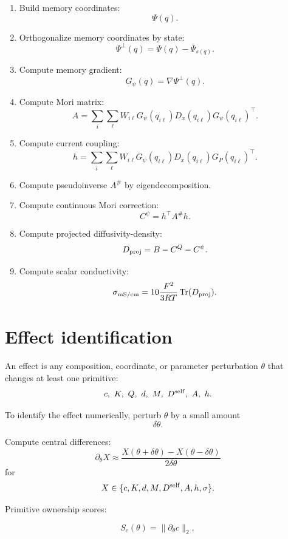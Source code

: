 \documentclass[11pt]{article}
\newcommand{\Tr}{\operatorname{Tr}}
\begin{document}
\begin{enumerate}
  \item Build memory coordinates:
  \[
  \Psi(q).
  \]

  \item Orthogonalize memory coordinates by state:
  \[
  \Psi^\perp(q)=\Psi(q)-\bar\Psi_{s(q)}.
  \]

  \item Compute memory gradient:
  \[
  G_\psi(q)=\nabla\Psi^\perp(q).
  \]

  \item Compute Mori matrix:
  \[
  A=
  \sum_i\sum_\ell
  W_{i\ell}
  G_\psi(q_{i\ell})
  D_x(q_{i\ell})
  G_\psi(q_{i\ell})^\top.
  \]

  \item Compute current coupling:
  \[
  h=
  \sum_i\sum_\ell
  W_{i\ell}
  G_\psi(q_{i\ell})
  D_x(q_{i\ell})
  G_P(q_{i\ell})^\top.
  \]

  \item Compute pseudoinverse \(A^\#\) by eigendecomposition.

  \item Compute continuous Mori correction:
  \[
  C^\psi=h^\top A^\#h.
  \]

  \item Compute projected diffusivity-density:
  \[
  D_{\rm proj}=B-C^Q-C^\psi.
  \]

  \item Compute scalar conductivity:
  \[
  \sigma_{\rm mS/cm}
  =
  10\frac{F^2}{3RT}\Tr(D_{\rm proj}).
  \]

  \end{enumerate}

  \section{Effect identification}

  An effect is any composition, coordinate, or parameter perturbation \(\theta\)
  that changes at least one primitive:
  \[
  c,\ K,\ Q,\ d,\ M,\ D^{\rm self},\ A,\ h.
  \]

  To identify the effect numerically, perturb \(\theta\) by a small amount
  \[
  \delta\theta.
  \]

  Compute central differences:
  \[
  \partial_\theta X
  \approx
  \frac{X(\theta+\delta\theta)-X(\theta-\delta\theta)}
  {2\delta\theta}
  \]
  for
  \[
  X\in
  \{c,K,d,M,D^{\rm self},A,h,\sigma\}.
  \]

  Primitive ownership scores:

  \[
  S_c(\theta)=\|\partial_\theta c\|_2,
  \]
\end{document}
